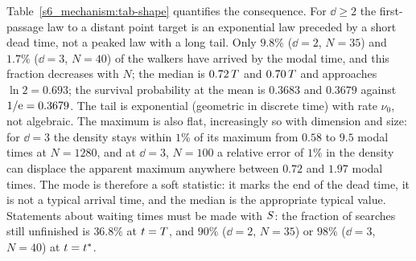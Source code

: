 Table~\ref{s6_mechanism:tab-shape} quantifies the consequence. For $\dd\ge2$ the first-passage law to a distant point
target is an exponential law preceded by a short dead time, not a peaked law with a long tail. Only $9.8\%$ ($\dd=2$,
$N=35$) and $1.7\%$ ($\dd=3$, $N=40$) of the walkers have arrived by the modal time, and this fraction decreases with $N$;
the median is $0.72\,T$ and $0.70\,T$ and approaches $\ln2=0.693$; the survival probability at the mean is $0.3683$ and
$0.3679$ against $1/\mathrm{e}=0.3679$. The tail is exponential (geometric in discrete time) with rate $\nu_0$, not algebraic.
The maximum is also flat, increasingly so with dimension and size: for $\dd=3$ the density stays within $1\%$ of its
maximum from $0.58$ to $9.5$ modal times at $N=1280$, and at $\dd=3$, $N=100$ a relative error of $1\%$ in the density can
displace the apparent maximum anywhere between $0.72$ and $1.97$ modal times. The mode is therefore a soft statistic: it
marks the end of the dead time, it is not a typical arrival time, and the median is the appropriate typical value.
Statements about waiting times must be made with $S$: the fraction of searches still unfinished is $36.8\%$ at
$t=T$, and $90\%$ ($\dd=2$, $N=35$) or $98\%$ ($\dd=3$, $N=40$) at $t=t^{*}$.

